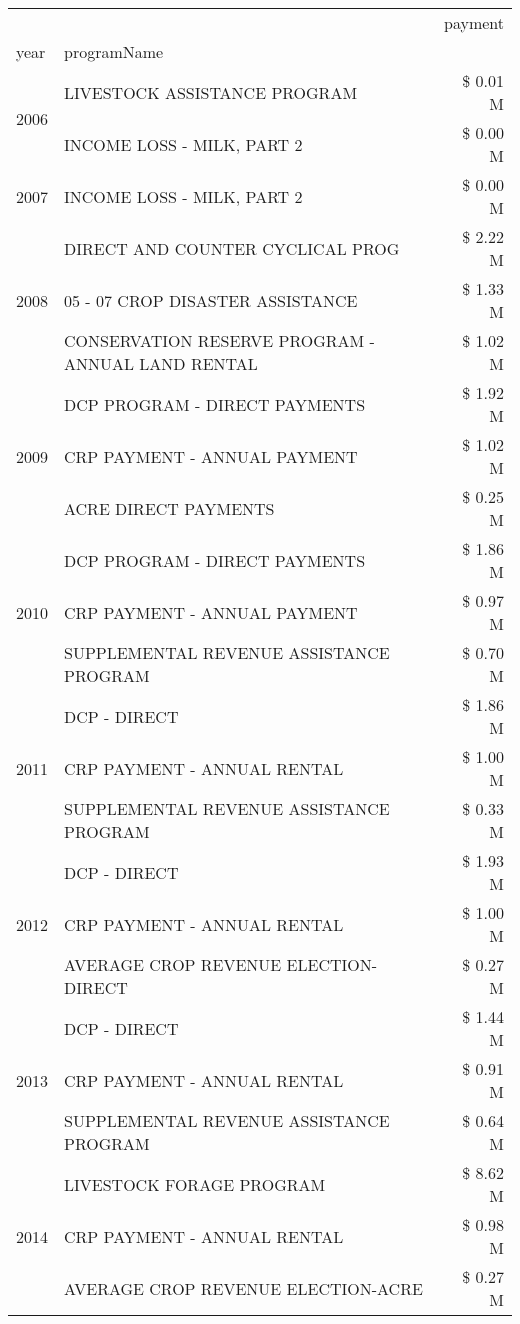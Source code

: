 \begin{tabular}{llr}
\toprule
 &  & payment \\
year & programName &  \\
\midrule
\multirow[t]{2}{*}{2006} & LIVESTOCK ASSISTANCE PROGRAM & \$ 0.01 M \\
 & INCOME LOSS - MILK, PART 2 & \$ 0.00 M \\
\cline{1-3}
2007 & INCOME LOSS - MILK, PART 2 & \$ 0.00 M \\
\cline{1-3}
\multirow[t]{3}{*}{2008} & DIRECT AND COUNTER CYCLICAL PROG & \$ 2.22 M \\
 & 05 - 07 CROP DISASTER ASSISTANCE & \$ 1.33 M \\
 & CONSERVATION RESERVE PROGRAM - ANNUAL LAND RENTAL & \$ 1.02 M \\
\cline{1-3}
\multirow[t]{3}{*}{2009} & DCP PROGRAM - DIRECT PAYMENTS & \$ 1.92 M \\
 & CRP PAYMENT - ANNUAL PAYMENT & \$ 1.02 M \\
 & ACRE DIRECT PAYMENTS & \$ 0.25 M \\
\cline{1-3}
\multirow[t]{3}{*}{2010} & DCP PROGRAM - DIRECT PAYMENTS & \$ 1.86 M \\
 & CRP PAYMENT - ANNUAL PAYMENT & \$ 0.97 M \\
 & SUPPLEMENTAL REVENUE ASSISTANCE PROGRAM & \$ 0.70 M \\
\cline{1-3}
\multirow[t]{3}{*}{2011} & DCP - DIRECT & \$ 1.86 M \\
 & CRP PAYMENT - ANNUAL RENTAL & \$ 1.00 M \\
 & SUPPLEMENTAL REVENUE ASSISTANCE PROGRAM & \$ 0.33 M \\
\cline{1-3}
\multirow[t]{3}{*}{2012} & DCP - DIRECT & \$ 1.93 M \\
 & CRP PAYMENT - ANNUAL RENTAL & \$ 1.00 M \\
 & AVERAGE CROP REVENUE ELECTION-DIRECT & \$ 0.27 M \\
\cline{1-3}
\multirow[t]{3}{*}{2013} & DCP - DIRECT & \$ 1.44 M \\
 & CRP PAYMENT - ANNUAL RENTAL & \$ 0.91 M \\
 & SUPPLEMENTAL REVENUE ASSISTANCE PROGRAM & \$ 0.64 M \\
\cline{1-3}
\multirow[t]{3}{*}{2014} & LIVESTOCK FORAGE PROGRAM & \$ 8.62 M \\
 & CRP PAYMENT - ANNUAL RENTAL & \$ 0.98 M \\
 & AVERAGE CROP REVENUE ELECTION-ACRE & \$ 0.27 M \\
\cline{1-3}

\end{tabular}
